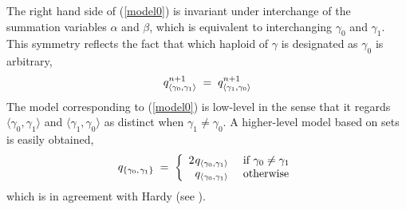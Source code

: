 The right hand side of (\ref{model0}) is invariant under interchange
of the summation variables $\alpha$ and $\beta$, which is equivalent
to interchanging $\gamma_0$ and $\gamma_1$.  This symmetry reflects
the fact that which haploid of $\gamma$ is designated as $\gamma_0$ is
arbitrary,\\[-.05in]
\[
q_{\langle \gamma_0, \gamma_1 \rangle}^{n+1} \; = \;
q_{\langle \gamma_1, \gamma_0 \rangle}^{n+1}\\[.1in]
\]
The model corresponding to (\ref{model0}) is low-level in the sense
that it regards $\langle \gamma_0, \gamma_1 \rangle$ and $\langle
\gamma_1, \gamma_0 \rangle$ as distinct when $\gamma_1 \neq \gamma_0$.
A higher-level model based on sets is easily obtained,
\[
q_{\{\gamma_0, \nudge \gamma_1\}} \; = \; \left\{
\begin{array}{ll}
2 \nudge q_{\langle \gamma_0, \gamma_1 \rangle} & \mbox{ if $\gamma_0 \neq \gamma_1$}\\
\phantom{2 \nudge }q_{\langle \gamma_0, \gamma_1 \rangle} & \mbox{ otherwise}
\end{array}
\right.\\[.05in]
\]
which is in agreement with Hardy (see \cite{Hardy1908}).

